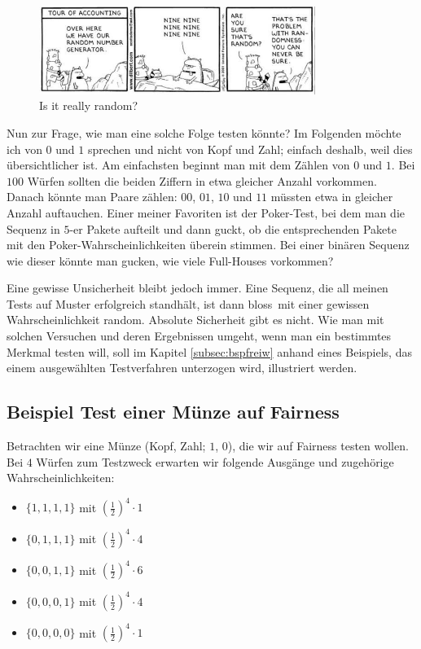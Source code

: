 \documentclass[%
11pt,%
twoside,%
titlepage,%
german,%
headsepline%
]{scrartcl}
\begin{document}
\begin{figure}
    \centering
    \includegraphics[width=0.8\textwidth]{pictures/randomgenerator.jpg}
    \caption{Is it really random?}
\end{figure}

Nun zur Frage, wie man eine solche Folge testen könnte?
Im Folgenden möchte ich von $0$ und $1$ sprechen und nicht von Kopf und Zahl; einfach deshalb, weil dies übersichtlicher ist.
Am einfachsten beginnt man mit dem Zählen von $0$ und $1$. Bei $100$ Würfen sollten die beiden Ziffern in etwa gleicher Anzahl vorkommen. Danach könnte man Paare zählen: $00$, $01$, $10$ und $11$ müssten etwa in gleicher Anzahl auftauchen. Einer meiner Favoriten ist der Poker-Test, bei dem man die Sequenz in $5$-er Pakete aufteilt und dann guckt, ob die entsprechenden Pakete mit den Poker-Wahrscheinlichkeiten überein stimmen. Bei einer binären Sequenz wie dieser könnte man gucken, wie viele Full-Houses vorkommen?\par
Eine gewisse Unsicherheit bleibt jedoch immer. Eine Sequenz, die all meinen Tests auf Muster erfolgreich standhält, ist dann \glqq bloss\grqq\ mit einer gewissen Wahrscheinlichkeit random. Absolute Sicherheit gibt es nicht. Wie man mit solchen Versuchen und deren Ergebnissen umgeht, wenn man ein bestimmtes Merkmal testen will, soll im Kapitel \ref{subsec:bspfreiw} anhand eines Beispiels, das einem ausgewählten Testverfahren unterzogen wird, illustriert werden.

\subsection{Beispiel Test einer Münze auf Fairness}

Betrachten wir eine Münze (Kopf, Zahl; $1$, $0$), die wir auf Fairness testen wollen. Bei $4$ Würfen zum Testzweck erwarten wir folgende Ausgänge und zugehörige Wahrscheinlichkeiten:
\begin{itemize}
    \item $\{1,1,1,1\}$ mit $(\tfrac{1}{2})^4\cdot1$
    \item $\{0,1,1,1\}$ mit $(\tfrac{1}{2})^4\cdot4$
    \item $\{0,0,1,1\}$ mit $(\tfrac{1}{2})^4\cdot6$
    \item $\{0,0,0,1\}$ mit $(\tfrac{1}{2})^4\cdot4$
    \item $\{0,0,0,0\}$ mit $(\tfrac{1}{2})^4\cdot1$
\end{itemize}
\end{document}
